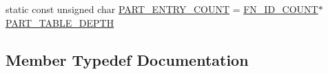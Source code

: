 \begin{DoxyCompactItemize}
\item 
static const unsigned char \hyperlink{structHarmonizeProgram_3_01PromiseUnion_3_01FN__IDS_8_8_8_4_00	PROGRAM__STATE_00	ADR__TYPE_00	ST96305cc1a177b714bc64a5044f46c97c_a4848b70c3215cfd6bafebba022df919a}{P\-A\-R\-T\-\_\-\-E\-N\-T\-R\-Y\-\_\-\-C\-O\-U\-N\-T} = \hyperlink{structHarmonizeProgram_3_01PromiseUnion_3_01FN__IDS_8_8_8_4_00	PROGRAM__STATE_00	ADR__TYPE_00	ST96305cc1a177b714bc64a5044f46c97c_a65d8dc32f58986606647fbe2132fe9cd}{F\-N\-\_\-\-I\-D\-\_\-\-C\-O\-U\-N\-T}$\ast$\hyperlink{structHarmonizeProgram_3_01PromiseUnion_3_01FN__IDS_8_8_8_4_00	PROGRAM__STATE_00	ADR__TYPE_00	ST96305cc1a177b714bc64a5044f46c97c_a39ee806efb203bec096738c0c78d4202}{P\-A\-R\-T\-\_\-\-T\-A\-B\-L\-E\-\_\-\-D\-E\-P\-T\-H}
\end{DoxyCompactItemize}


\subsection{Member Typedef Documentation}

